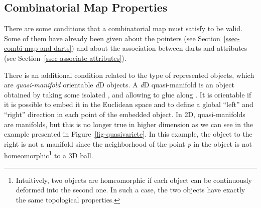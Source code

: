 \subsection{Combinatorial Map Properties}\label{ssec-combimap-validity}
There are some conditions that a combinatorial map must satisfy to be
valid. Some of them have already been given about the \betats{} pointers
(see Section~\ref{ssec-combi-map-and-darts}) and about the association
between darts and attributes (see
Section~\ref{ssec-associate-attributes}).

There is an additional condition related to the type of represented
objects, which are \emph{quasi-manifold} orientable \emph{d}D objects.  A
\emph{d}D quasi-manifold is an object obtained by taking some isolated
, and allowing to glue  along . It is
orientable if it is possible to embed it in the Euclidean space and to
define a global ``left'' and ``right'' direction in each point of the
embedded object.  In 2D, quasi-manifolds are manifolds, but this is no
longer true in higher dimension as we can see in the example presented
in Figure~\ref{fig-quasivariete}.  In this example, the object to the
right is not a manifold since the neighborhood of the point \emph{p} in the
object is not homeomorphic\footnote{Intuitively, two objects are
  homeomorphic if each object can be continuously deformed into the
  second one.  In such a case, the two objects have exactly the same
  topological properties.}  to a 3D ball.
%
